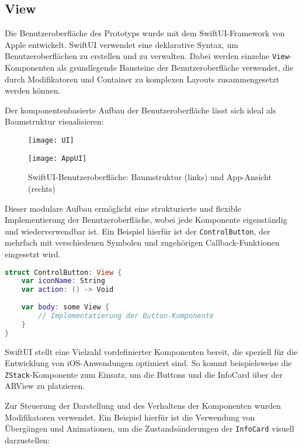 \subsection{View}

Die Benutzeroberfläche des Prototyps wurde mit dem SwiftUI-Framework von Apple entwickelt. SwiftUI verwendet eine deklarative Syntax, um Benutzeroberflächen zu erstellen und zu verwalten. Dabei werden einzelne \texttt{View}-Komponenten als grundlegende Bausteine der Benutzeroberfläche verwendet, die durch Modifikatoren und Container zu komplexen Layouts zusammengesetzt werden können. \cite{appledevdoc}

Der komponentenbasierte Aufbau der Benutzeroberfläche lässt sich ideal als Baumstruktur visualisieren:

\begin{figure}[h]
    \centering
    \begin{minipage}{0.45\textwidth}
        \centering
        \texttt{[image: UI]}
    \end{minipage}
    \hfill
    \begin{minipage}{0.45\textwidth}
        \centering
        \texttt{[image: AppUI]}
    \end{minipage}
    \caption{SwiftUI-Benutzeroberfläche: Baumstruktur (links) und App-Ansicht (rechts)}
    \label{fig:AppUI}
\end{figure}

Dieser modulare Aufbau ermöglicht eine strukturierte und flexible Implementierung der Benutzeroberfläche, wobei jede Komponente eigenständig und wiederverwendbar ist. Ein Beispiel hierfür ist der \texttt{ControlButton}, der mehrfach mit verschiedenen Symbolen und zugehörigen Callback-Funktionen eingesetzt wird.

\begin{lstlisting}[language=Swift]
struct ControlButton: View {
    var iconName: String
    var action: () -> Void
        
    var body: some View {
        // Implementatierung der Button-Komponente
    }
}
\end{lstlisting}

SwiftUI stellt eine Vielzahl vordefinierter Komponenten bereit, die speziell für die Entwicklung von iOS-Anwendungen optimiert sind. So kommt beispielsweise die \texttt{ZStack}-Komponente zum Einsatz, um die Buttons und die InfoCard über der ARView zu platzieren.

Zur Steuerung der Darstellung und des Verhaltens der Komponenten wurden Modifikatoren verwendet. Ein Beispiel hierfür ist die Verwendung von Übergängen und Animationen, um die Zustandsänderungen der \texttt{InfoCard} visuell darzustellen:

